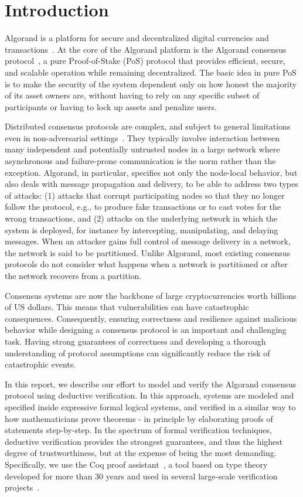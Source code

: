 \section{Introduction}

Algorand is a platform for secure and decentralized digital currencies and transactions~\cite{Micali2019}. At the core of the Algorand platform is the Algorand consensus protocol~\cite{Chen2018,Chen2019}, a pure Proof-of-Stake (PoS) protocol that provides efficient, secure, and scalable operation while remaining decentralized. The basic idea in pure PoS is to make the security of the system dependent only on how honest the majority of its asset owners are, without having to rely on any specific subset of participants or having to lock up assets and penalize users.

Distributed consensus protocols are complex, and subject to general limitations even in non-adversarial settings~\cite{Fischer1985}. They typically involve interaction between many independent and potentially untrusted nodes in a large network where asynchronous and failure-prone communication is the norm rather than the exception.
Algorand, in particular, specifies not only the node-local behavior, but also deals with message propagation and delivery, to be able to address two types of attacks: (1) attacks that corrupt participating nodes so that they no longer follow the protocol, e.g., to produce fake transactions or to cast votes for the wrong transactions, and (2) attacks on the underlying network in which the system is deployed, for instance by intercepting, manipulating, and delaying messages. When an attacker gains full control of message delivery in a network, the network is said to be partitioned. Unlike Algorand, most existing consensus protocols do not consider what happens when a network is partitioned or after the network recovers from a partition.

Consensus systems are now the backbone of large cryptocurrencies worth billions of US dollars. This means that vulnerabilities can have catastrophic consequences. Consequently, ensuring correctness and resilience against malicious behavior while designing a consensus protocol is an important and challenging task. Having strong guarantees of correctness and developing a thorough understanding of protocol assumptions can significantly reduce the risk of catastrophic events.

In this report, we describe our effort to model and verify the Algorand consensus protocol using deductive verification. In this approach, systems are modeled and specified inside expressive formal logical systems, and verified in a similar way to how mathematicians prove theorems - in principle by elaborating proofs of statements step-by-step. In the spectrum of formal verification techniques, deductive verification provides the strongest guarantees, and thus the highest degree of trustworthiness, but at the expense of being the most demanding. Specifically, we use the Coq proof assistant~\cite{CoqArt}, a tool based on type theory developed for more than 30 years and used in several large-scale verification projects~\cite{Leroy2009,Woos2016}.

